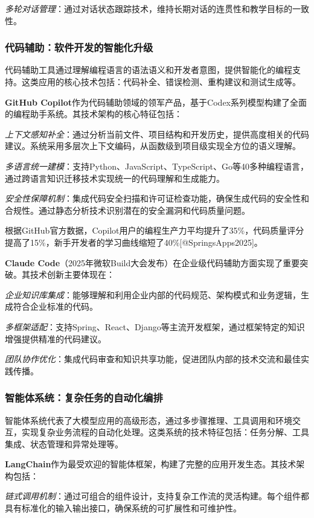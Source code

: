 \documentclass{article}
\begin{document}
\textit{多轮对话管理}：通过对话状态跟踪技术，维持长期对话的连贯性和教学目标的一致性。

\subsubsection{代码辅助：软件开发的智能化升级}
代码辅助工具通过理解编程语言的语法语义和开发者意图，提供智能化的编程支持。这类应用的核心技术包括：代码补全、错误检测、重构建议和测试生成等。

\textbf{GitHub Copilot}作为代码辅助领域的领军产品，基于Codex系列模型构建了全面的编程助手系统。其技术架构的核心特征包括：

\textit{上下文感知补全}：通过分析当前文件、项目结构和开发历史，提供高度相关的代码建议。系统采用多层次上下文编码，从函数级到项目级实现全方位的语义理解。

\textit{多语言统一建模}：支持Python、JavaScript、TypeScript、Go等40多种编程语言，通过跨语言知识迁移技术实现统一的代码理解和生成能力。

\textit{安全性保障机制}：集成代码安全扫描和许可证检查功能，确保生成代码的安全性和合规性。通过静态分析技术识别潜在的安全漏洞和代码质量问题。

根据GitHub官方数据，Copilot用户的编程生产力平均提升了35\%，代码质量评分提高了15\%，新手开发者的学习曲线缩短了40\%[@SpringsApps2025]。

\textbf{Claude Code}（2025年微软Build大会发布）在企业级代码辅助方面实现了重要突破。其技术创新主要体现在：

\textit{企业知识库集成}：能够理解和利用企业内部的代码规范、架构模式和业务逻辑，生成符合企业标准的代码。

\textit{多框架适配}：支持Spring、React、Django等主流开发框架，通过框架特定的知识增强提供精准的代码建议。

\textit{团队协作优化}：集成代码审查和知识共享功能，促进团队内部的技术交流和最佳实践传播。

\subsubsection{智能体系统：复杂任务的自动化编排}
智能体系统代表了大模型应用的高级形态，通过多步骤推理、工具调用和环境交互，实现复杂业务流程的自动化处理。这类系统的技术特征包括：任务分解、工具集成、状态管理和异常处理等。

\textbf{LangChain}作为最受欢迎的智能体框架，构建了完整的应用开发生态。其技术架构包括：

\textit{链式调用机制}：通过可组合的组件设计，支持复杂工作流的灵活构建。每个组件都具有标准化的输入输出接口，确保系统的可扩展性和可维护性。
\end{document}
